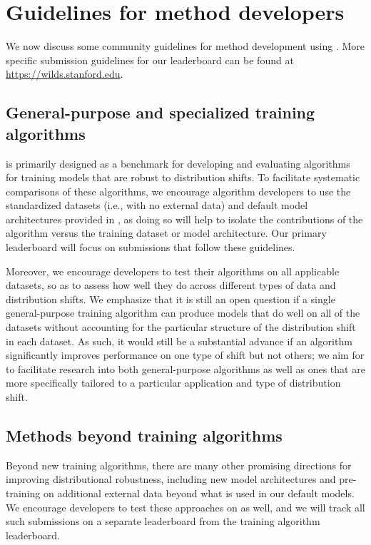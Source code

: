 \section{Guidelines for method developers}\label{sec:guidelines}

We now discuss some community guidelines for method development using \Wilds.
More specific submission guidelines for our leaderboard can be found at
\url{https://wilds.stanford.edu}.

\subsection{General-purpose and specialized training algorithms}
\Wilds is primarily designed as a benchmark for developing and evaluating  algorithms for training models that are robust to distribution shifts.
To facilitate systematic comparisons of these algorithms,
we encourage algorithm developers to use the standardized datasets (i.e., with no external data) and default model architectures provided in \Wilds,
as doing so will help to isolate the contributions of the algorithm versus the training dataset or model architecture.
Our primary leaderboard will focus on submissions that follow these guidelines.

Moreover, we encourage developers to test their algorithms on all applicable \Wilds datasets, so as to assess how well they do across different types of data and distribution shifts. We emphasize that it is still an open question
if a single general-purpose training algorithm can produce models that do well on all of the datasets without accounting for the particular structure of the distribution shift in each dataset.
As such, it would still be a substantial advance if an algorithm significantly improves performance on one type of shift but not others;
we aim for \Wilds to facilitate research into both general-purpose algorithms as well as ones that are more specifically tailored to a particular application and type of distribution shift.

\subsection{Methods beyond training algorithms}
Beyond new training algorithms, there are many other promising directions for improving distributional robustness, including new model architectures and pre-training on additional external data beyond what is used in our default models. We encourage developers to test these approaches on \Wilds as well, and we will track all such submissions on a separate leaderboard from the training algorithm leaderboard.

